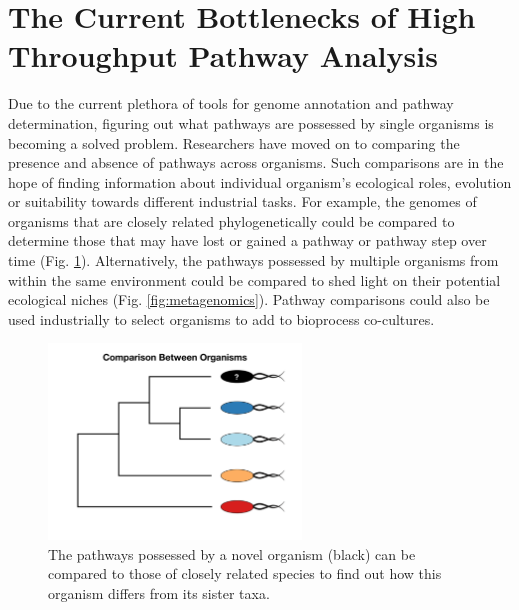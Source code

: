 \section{The Current Bottlenecks of High Throughput Pathway Analysis}

Due to the current plethora of tools for genome annotation and pathway determination, figuring out what pathways are possessed by single organisms is becoming a solved problem. Researchers have moved on to comparing the presence and absence of pathways across organisms. Such comparisons are in the hope of finding information about individual organism's ecological roles, evolution or suitability towards different industrial tasks. For example, the genomes of organisms that are closely related phylogenetically could be compared to determine those that may have lost or gained a pathway or pathway step over time (Fig. \ref{fig:phylogenetic-comparison}). Alternatively, the pathways possessed by multiple organisms from within the same environment could be compared to shed light on their potential ecological niches (Fig. \ref{fig:metagenomics}). Pathway comparisons could also be used industrially to select organisms to add to bioprocess co-cultures.

\begin{figure}[!ht]
  \centering
	\includegraphics[width=0.6\textwidth]{media/compare-phylogenetically.pdf}
	 \caption{The pathways possessed by a novel organism (black) can be compared to those of closely related species to find out how this organism differs from its sister taxa.}
	 \label{fig:phylogenetic-comparison}
\end{figure}

